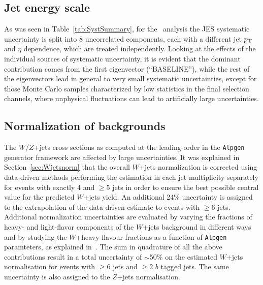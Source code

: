 \subsection{Jet energy scale}\label{sec:htx_syst_jes}
As was seen in Table~\ref{tab:SystSummary}, for the \htx\ analysis
the JES systematic uncertainty is split into 8
uncorrelated components, each with a different jet $\pt$ and $\eta$
dependence, which are treated independently.
Looking at the effects of the individual sources of systematic uncertainty, 
it is evident that the dominant contribution comes from the first 
eigenvector (``BASELINE''), while the rest of the
eigenvectors lead in general to very small systematic uncertainties, 
except for those Monte Carlo samples characterized by low statistics
in the final selection channels, where unphysical fluctuations
can lead to artificially large uncertainties. 

\subsection{Normalization of backgrounds}\label{sec:syst_normHTX}

The $W$/$Z$+jets cross sections as computed at the
leading-order in the
\texttt{Alpgen} generator framework
are affected by large uncertainties.
It was explained in Section~\ref{sec:Wjetsnorm}
that the overall $W$+jets normalization is 
corrected using data-driven methods 
performing the estimation in each jet multiplicity
separately for events with exactly 4 and $\geq 5$ 
jets in order to ensure the best possible central value for the 
predicted $W$+jets yield. 
An additional 24\% uncertainty is assigned to the extrapolation of the data driven
estimate to events with $\geq 6$ jets.
Additional normalization uncertainties are evaluated by varying 
the fractions of heavy- and light-flavor components of the $W$+jets background
in different ways and by studying the $W$+heavy-flavour fractions as
a function of \texttt{Alpgen} paramteters,
as explained in~\cite{topcommon2013}.
The sum in quadrature of all the above contributions result in a 
total uncertainty of $\sim$50\% on
the estimated $W$+jets normalisation for events 
with $\geq 6$ jets and $\geq 2$ $b$ tagged jets. 
The same uncertainty is also assigned to the $Z$+jets normalisation.

